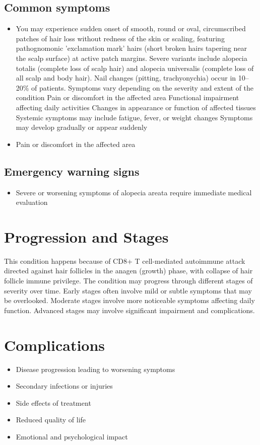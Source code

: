 \subsection{Common symptoms}
\begin{itemize}[noitemsep]
  \item You may experience sudden onset of smooth, round or oval, circumscribed patches of hair loss without redness of the skin or scaling, featuring pathognomonic 'exclamation mark' hairs (short broken hairs tapering near the scalp surface) at active patch margins. Severe variants include alopecia totalis (complete loss of scalp hair) and alopecia universalis (complete loss of all scalp and body hair). Nail changes (pitting, trachyonychia) occur in 10--20\% of patients. Symptoms vary depending on the severity and extent of the condition Pain or discomfort in the affected area Functional impairment affecting daily activities Changes in appearance or function of affected tissues Systemic symptoms may include fatigue, fever, or weight changes Symptoms may develop gradually or appear suddenly
  \item Pain or discomfort in the affected area
  \end{itemize}

\subsection{Emergency warning signs}
\begin{itemize}[noitemsep]
  \item Severe or worsening symptoms of alopecia areata require immediate medical evaluation
\end{itemize}
\section{Progression and Stages}
This condition happens because of CD8+ T cell-mediated autoimmune attack directed against hair follicles in the anagen (growth) phase, with collapse of hair follicle immune privilege. The condition may progress through different stages of severity over time. Early stages often involve mild or subtle symptoms that may be overlooked. Moderate stages involve more noticeable symptoms affecting daily function. Advanced stages may involve significant impairment and complications.
\section{Complications}
\begin{itemize}[noitemsep]
  \item Disease progression leading to worsening symptoms
  \item Secondary infections or injuries
  \item Side effects of treatment
  \item Reduced quality of life
  \item Emotional and psychological impact
\end{itemize}
